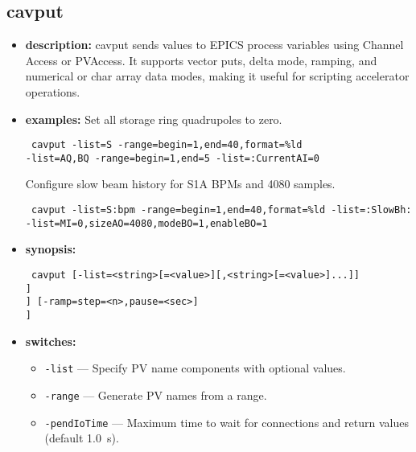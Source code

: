 \newpage
\subsection{cavput}
\label{cavput}

\begin{itemize}
  \item {\bf description:}
    cavput sends values to EPICS process variables using Channel Access or PVAccess. It supports vector puts, delta mode, ramping, and numerical or char array data modes, making it useful for scripting accelerator operations.
  \item {\bf examples:}
    Set all storage ring quadrupoles to zero.
    \begin{flushleft}{\tt
    cavput -list=S -range=begin=1,end=40,format=\%ld\\
      -list=AQ,BQ -range=begin=1,end=5 -list=:CurrentAI=0
    }\end{flushleft}
    Configure slow beam history for S1A BPMs and 4080 samples.
    \begin{flushleft}{\tt
    cavput -list=S:bpm -range=begin=1,end=40,format=\%ld -list=:SlowBh:\\
      -list=MI=0,sizeAO=4080,modeBO=1,enableBO=1
    }\end{flushleft}
  \item {\bf synopsis:}
    \begin{flushleft}{\tt
    cavput [-list=<string>[=<value>][,<string>[=<value>]...]]\\\relax
      [-range=begin=<integer>,end=<integer>[,format=<string>][,interval=<integer>]]\\\relax
      [-pendIoTime=<seconds>] [-dryRun] [-deltaMode[=factor=<value>]] [-ramp=step=<n>,pause=<sec>]\\\relax
      [-numerical] [-charArray] [-blunderAhead[=silently]]\\\relax
      [-provider=\{ca|pva\}]
    }\end{flushleft}
  \item {\bf switches:}
    \begin{itemize}
      \item {\tt -list} --- Specify PV name components with optional values.
      \item {\tt -range} --- Generate PV names from a range.
      \item {\tt -pendIoTime} --- Maximum time to wait for connections and return values (default 1.0~s).

\end{itemize}
\end{itemize}
